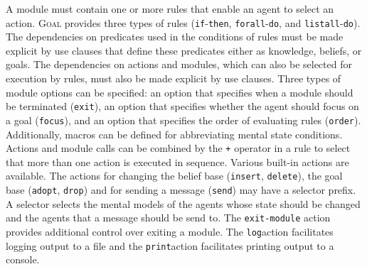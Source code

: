 \documentclass{article}
\newcommand{\GOAL}{\textsc{Goal}\xspace}
\begin{document}
\newcommand{\exit}{\texttt{exit}\xspace}
\newcommand{\focus}{\texttt{focus}\xspace}
\newcommand{\order}{\texttt{order}\xspace}
\newcommand{\always}{\texttt{always}\xspace}
\newcommand{\never}{\texttt{never}\xspace}
\newcommand{\nogoals}{\texttt{nogoals}\xspace}
\newcommand{\noaction}{\texttt{noaction}\xspace}
\newcommand{\none}{\texttt{none}\xspace}
\newcommand{\new}{\texttt{new}\xspace}
\newcommand{\select}{\texttt{select}\xspace}
\newcommand{\filter}{\texttt{filter}\xspace}
\newcommand{\linear}{\texttt{linear}\xspace}
\newcommand{\linearall}{\texttt{linearall}\xspace}
\newcommand{\linearrandom}{\texttt{linearrandom}\xspace}
\newcommand{\random}{\texttt{random}\xspace}
\newcommand{\randomall}{\texttt{randomall}\xspace}
\newcommand{\adaptive}{\texttt{adaptive}\xspace}
\newcommand{\ifp}{\texttt{if}\xspace}
\newcommand{\thenp}{\texttt{then}\xspace}
\newcommand{\forallp}{\texttt{forall}\xspace}
\newcommand{\dop}{\texttt{do}\xspace}
\newcommand{\listall}{\texttt{listall}\xspace}
\newcommand{\notp}{\texttt{not}}
\newcommand{\belp}{\texttt{bel}}
\newcommand{\goalp}{\texttt{goal}}
\newcommand{\agoalp}{\texttt{a-goal}}
\newcommand{\goalap}{\texttt{goal-a}}
\newcommand{\percept}{\texttt{percept}}
\newcommand{\sent}{\texttt{sent}}
\newcommand{\truep}{\texttt{true}\xspace}
\newcommand{\insertp}{\texttt{insert}}
\newcommand{\deletep}{\texttt{delete}}
\newcommand{\adoptp}{\texttt{adopt}}
\newcommand{\dropp}{\texttt{drop}}
\newcommand{\sendp}{\texttt{send}}
\newcommand{\exitmodule}{\texttt{exit-module}\xspace}
\newcommand{\logp}{\texttt{log}}
\newcommand{\print}{\texttt{print}}
\newcommand{\allp}{\texttt{all}}
\newcommand{\allother}{\texttt{allother}}
\newcommand{\somep}{\texttt{some}}
\newcommand{\someother}{\texttt{someother}}
\newcommand{\self}{\texttt{self}}
\newcommand{\this}{\texttt{this}}

A module must contain one or more rules that enable an agent to select an action. \GOAL provides three types of rules (\ifp-\thenp, \forallp-\dop, and \listall-\dop). The dependencies on predicates used in the conditions of rules must be made explicit by use clauses that define these predicates either as knowledge, beliefs, or goals. The dependencies on actions and modules, which can also be selected for execution by rules, must also be made explicit by use clauses. Three types of module options can be specified: an option that specifies when a module should be terminated (\exit), an option that specifies whether the agent should focus on a goal (\focus), and an option that specifies the order of evaluating rules (\order). Additionally, macros can be defined for abbreviating mental state conditions. Actions and module calls can be combined by the \texttt{+} operator in a rule to select that more than one action is executed in sequence. Various built-in actions are available. The actions for changing the belief base (\insertp, \deletep), the goal base (\adoptp, \dropp) and for sending a message (\sendp) may have a selector prefix. A selector selects the mental models of the agents whose state should be changed and the agents that a message should be send to. The \exitmodule action provides additional control over exiting a module. The \logp action facilitates logging output to a file and the \print action facilitates printing output to a console.
\end{document}

